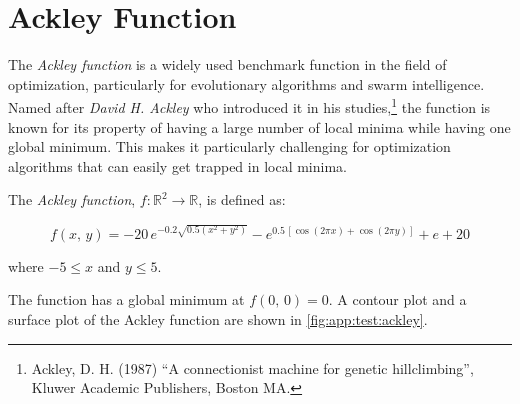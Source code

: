 
\section{Ackley Function}
\label{sec:app:test:ackley}
  The \emph{Ackley function} is a widely used benchmark function in the field
  of optimization, particularly for evolutionary algorithms and swarm
  intelligence.
  Named after \textit{David H. Ackley} who introduced it in his 
  studies,\footnote{%
    Ackley, D. H. (1987) \enquote{A connectionist machine for genetic 
    hillclimbing}, Kluwer Academic Publishers, Boston MA.
  }
  the function is known for its property of having a large number of local
  minima while having one global minimum.
  This makes it particularly challenging for optimization algorithms that can
  easily get trapped in local minima.

  \begin{definition}
    The \emph{Ackley function}, \(f: \mathbb{R}^2 \rightarrow \mathbb{R}\), is
    defined as:

    \begin{equation}
      \label{eq:app:test:ackley}
      f(x,\, y) = -20\, e^{-0.2 \sqrt{0.5 (x^2 + y^2)}}
        - e^{0.5\, [\cos(2 \pi x) + \cos(2\pi y)]} + e + 20
    \end{equation}

    where \(-5 \leq x\) and \(y \leq 5\).
  \end{definition}

  The function has a global minimum at \(f(0,\, 0) = 0\).
  A contour plot and a surface plot of the Ackley function are shown in
  \vref{fig:app:test:ackley}.

